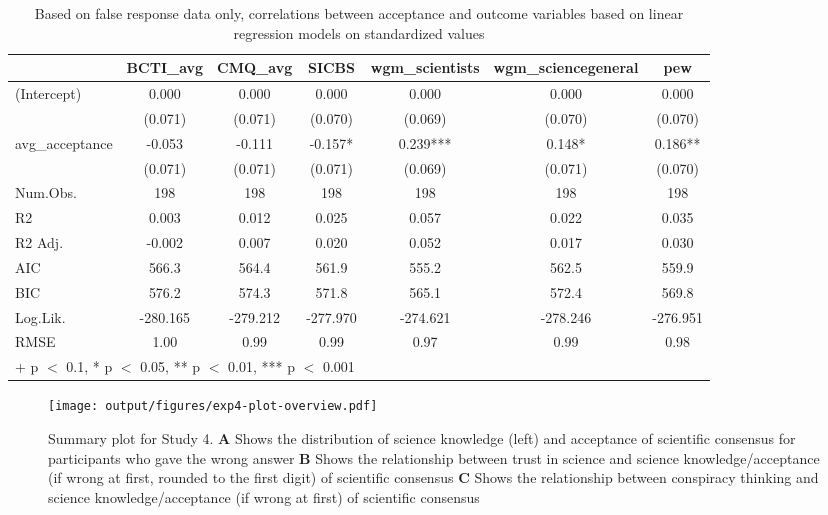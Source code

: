 \documentclass[
  doc,floatsintext]{apa6}
\begin{document}
\begin{table}
\centering
\caption{\label{tab:exp4-false-response-regression}Based on false response data only, correlations between acceptance and outcome variables based on linear regression models on standardized values}
\centering
\begin{tabular}[t]{lcccccc}
\toprule
  & BCTI\_avg & CMQ\_avg & SICBS & wgm\_scientists & wgm\_sciencegeneral & pew\\
\midrule
(Intercept) & 0.000 & 0.000 & 0.000 & 0.000 & 0.000 & 0.000\\
 & (0.071) & (0.071) & (0.070) & (0.069) & (0.070) & (0.070)\\
avg\_acceptance & -0.053 & -0.111 & -0.157* & 0.239*** & 0.148* & 0.186**\\
 & (0.071) & (0.071) & (0.071) & (0.069) & (0.071) & (0.070)\\
\midrule
Num.Obs. & 198 & 198 & 198 & 198 & 198 & 198\\
R2 & 0.003 & 0.012 & 0.025 & 0.057 & 0.022 & 0.035\\
R2 Adj. & -0.002 & 0.007 & 0.020 & 0.052 & 0.017 & 0.030\\
AIC & 566.3 & 564.4 & 561.9 & 555.2 & 562.5 & 559.9\\
BIC & 576.2 & 574.3 & 571.8 & 565.1 & 572.4 & 569.8\\
Log.Lik. & -280.165 & -279.212 & -277.970 & -274.621 & -278.246 & -276.951\\
RMSE & 1.00 & 0.99 & 0.99 & 0.97 & 0.99 & 0.98\\
\bottomrule
\multicolumn{7}{l}{\rule{0pt}{1em}+ p $<$ 0.1, * p $<$ 0.05, ** p $<$ 0.01, *** p $<$ 0.001}\\
\end{tabular}
\end{table}



\begin{figure}
\centering
\texttt{[image: output/figures/exp4-plot-overview.pdf]}
\caption{\label{fig:exp4-plot-overview}Summary plot for Study 4. \textbf{A} Shows the distribution of science knowledge (left) and acceptance of scientific consensus for participants who gave the wrong answer \textbf{B} Shows the relationship between trust in science and science knowledge/acceptance (if wrong at first, rounded to the first digit) of scientific consensus \textbf{C} Shows the relationship between conspiracy thinking and science knowledge/acceptance (if wrong at first) of scientific consensus}
\end{figure}
\end{document}

